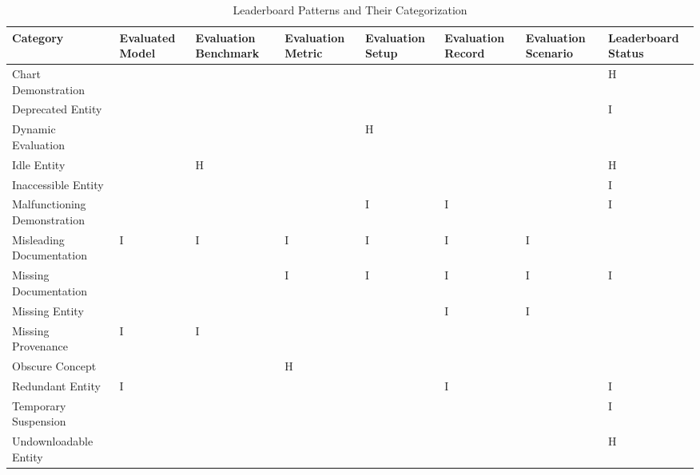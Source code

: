 \begin{table}
\caption{Leaderboard Patterns and Their Categorization}
\label{tab:pattern}
\begin{tabular}{llllllll}
\toprule
Category & Evaluated Model & Evaluation Benchmark & Evaluation Metric & Evaluation Setup & Evaluation Record & Evaluation Scenario & Leaderboard Status \\
\midrule
Chart Demonstration &  &  &  &  &  &  & H \\
Deprecated Entity &  &  &  &  &  &  & I \\
Dynamic Evaluation &  &  &  & H &  &  &  \\
Idle Entity &  & H &  &  &  &  & H \\
Inaccessible Entity &  &  &  &  &  &  & I \\
Malfunctioning Demonstration &  &  &  & I & I & & I \\
Misleading Documentation & I & I & I & I & I & I &  \\
Missing Documentation &  &  & I & I & I & I & I \\
Missing Entity &  &  &  &  & I & I &  \\
Missing Provenance & I & I &  &  &  &  &  \\
Obscure Concept &  &  & H &  &  &  &  \\
Redundant Entity & I &  &  &  & I &  & I \\
Temporary Suspension &  &  &  &  &  &  & I \\
Undownloadable Entity &  &  &  &  &  &  & H \\
\bottomrule
\end{tabular}
\end{table}
